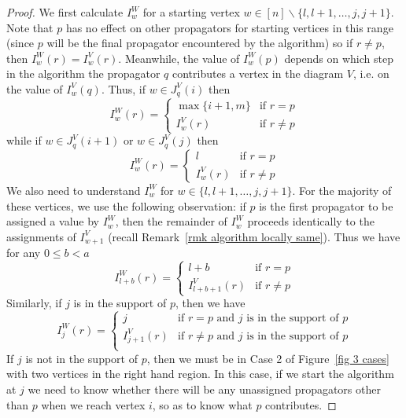 \documentclass[11pt]{article}
\theoremstyle{remark}
\theoremstyle{definition}
\begin{document}
\begin{proof}
We first calculate $I^{W}_w$ for a starting vertex ${w \in [n]\backslash \{l, l+1, \ldots,j,j+1\}}$. Note that $p$ has no effect on other propagators for starting vertices in this range (since $p$ will be the final propagator encountered by the algorithm) so if $r \neq p$, then $I_w^W(r) = I_w^V(r)$. Meanwhile, the value of $I^{W}_w(p)$ depends on which step in the algorithm the propagator $q$ contributes a vertex in the diagram $V$, i.e. on the value of $I^{V}_w(q)$. Thus, if $w\in J_q^{V}(i)$ then 
    \[
    I_w^{W}(r) =  \begin{cases}
        \max\{i+1, m\} & \text{if } r=p \\
        I_{w}^{V}(r) & \text{if } r\neq p
      \end{cases} 
    \]
    while if $w\in J_q^{V}(i+1)$ or $w\in J_q^{V}(j)$ then
    \[
    I_w^{W}(r) =  \begin{cases}
        l & \text{if } r=p \\
        I_{w}^{V}(r) & \text{if } r\neq p
      \end{cases} 
      \]
We also need to understand $I^{W}_w$ for $w \in \{l,l+1,\ldots,j,j+1\}$. For the majority 
of these vertices, we use the following observation: if $p$ is the first propagator to be assigned a value by $I_w^{W}$, then the remainder of $I_w^{W}$ proceeds identically to the assignments of $I^{V}_{w+1}$ (recall Remark~\ref{rmk algorithm locally same}).  Thus we have for any $0\leq b <a$
    \[
    I_{l+b}^{W}(r) = \begin{cases}
      l+b & \text{if } r=p\\
      I_{l+b+1}^{V}(r) & \text{if } r\neq p
    \end{cases}
    \]
Similarly, if $j$ is in the support of $p$, then we have
     \[
       I_j^{W}(r) = \begin{cases}
         j & \text{if $r=p$ and $j$ is in the support of $p$}\\
         I_{j+1}^{V}(r) & \text{if $r\neq p$ and $j$ is in the support of $p$}\\
       \end{cases}
       \]
If $j$ is not in the support of $p$, then we must be in Case 2 of Figure~\ref{fig 3 cases} with two vertices in the right hand region.  In this case, if we start the algorithm at $j$ we need to know whether there will be any unassigned propagators other than $p$ when we reach vertex $i$, so as to know what $p$ contributes.


\end{proof}
\end{document}
